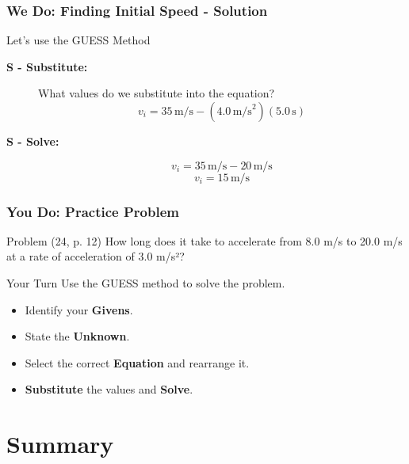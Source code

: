 \documentclass{beamer}
\begin{document}
\begin{frame}
\frametitle{We Do: Finding Initial Speed - Solution}
\begin{block}{Let's use the GUESS Method}
\begin{description}
    \item[\textbf{S - Substitute:}]
        \alert{What values do we substitute into the equation?}
        \pause
        \[ v_i = 35 \, \text{m/s} - (4.0 \, \text{m/s}^2)(5.0 \, \text{s}) \]
    \item[\textbf{S - Solve:}]
        \[ v_i = 35 \, \text{m/s} - 20 \, \text{m/s} \]
        \[ v_i = 15 \, \text{m/s} \]
\end{description}
\end{block}
\end{frame}

\begin{frame}
\frametitle{You Do: Practice Problem}
\begin{block}{Problem (24, p. 12)}
How long does it take to accelerate from 8.0 m/s to 20.0 m/s at a rate of acceleration of 3.0 m/s²?
\end{block}
\vfill
\begin{alertblock}{Your Turn}
Use the GUESS method to solve the problem.
\begin{itemize}
    \item Identify your \textbf{Givens}.
    \item State the \textbf{Unknown}.
    \item Select the correct \textbf{Equation} and rearrange it.
    \item \textbf{Substitute} the values and \textbf{Solve}.
\end{itemize}
\end{alertblock}
\end{frame}

\section{Summary}
\end{document}
